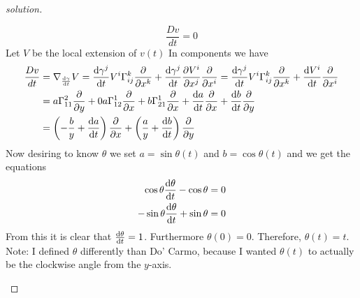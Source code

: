 \documentclass[a4paper]{article}
\begin{document}
\begin{proof}[solution]
\begin{enumerate}[(a)]
  \[
    \frac{Dv}{dt} = 0
  \]
  Let $V$ be the local extension of $v(t)$
  In components we have
  \[
    \begin{aligned}
      \frac{Dv}{dt} &= \nabla_{\dv{\gamma}{t}} V =  \dv{\gamma^j}{t}V^i \Gamma_{ij}^k \pdv{x^k} + \dv{\gamma^j}{t}\pdv{V^i}{x^j} \pdv{x^i} = \dv{\gamma^j}{t}V^i \Gamma_{ij}^k \pdv{x^k} + \dv{V^i}{t} \pdv{x^i} \\
                    &= a\Gamma_{11}^2 \pdv{y} + 0a \Gamma_{12}^1 \pdv{x} + b\Gamma_{21}^1 \pdv{x} + \dv{a}{t} \pdv{x} + \dv{b}{t} \pdv{y}\\
                    &= \left(-\frac{b}{y}  + \dv{a}{t} \right)\pdv{x} + \left(\frac{a}{y} + \dv{b}{t}\right)\pdv{y} \\
    \end{aligned}
  \]
  Now desiring to know $\theta$ we set $a = \sin \theta(t)$ and $b = \cos \theta(t)$ and we get the equations
  \[
    \begin{aligned}
    \cos \theta \dv{\theta}{t} - \cos \theta &= 0 \\
    -\sin \theta \dv{\theta}{t} + \sin \theta &= 0
    \end{aligned}
  \]
  From this it is clear that $\dv{\theta}{t} = 1$. Furthermore $\theta(0) = 0$. Therefore, $\theta(t) = t$. Note: I defined $\theta$ differently than Do' Carmo, because I wanted $\theta(t)$ to actually be the clockwise angle from the $y$-axis.
  \end{enumerate}
\end{proof}
\end{document}
